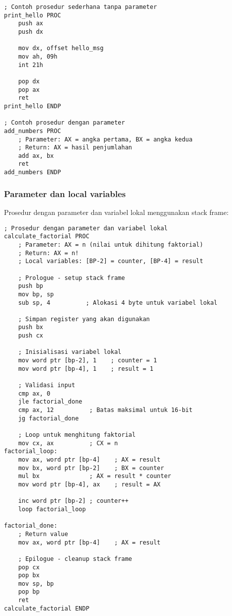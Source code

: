 \documentclass[../main.tex]{subfiles}
\begin{document}
                \begin{lstlisting}[language={[x86masm]Assembler}, caption=Contoh Prosedur Sederhana, label={lst:simple-procedure}]
; Contoh prosedur sederhana tanpa parameter
print_hello PROC
    push ax
    push dx
    
    mov dx, offset hello_msg
    mov ah, 09h
    int 21h
    
    pop dx
    pop ax
    ret
print_hello ENDP

; Contoh prosedur dengan parameter
add_numbers PROC
    ; Parameter: AX = angka pertama, BX = angka kedua
    ; Return: AX = hasil penjumlahan
    add ax, bx
    ret
add_numbers ENDP
                \end{lstlisting}

            \subsubsection{Parameter dan local variables}
                Prosedur dengan parameter dan variabel lokal menggunakan stack frame:

                \begin{lstlisting}[language={[x86masm]Assembler}, caption=Prosedur dengan Stack Frame, label={lst:stack-frame-procedure}]
; Prosedur dengan parameter dan variabel lokal
calculate_factorial PROC
    ; Parameter: AX = n (nilai untuk dihitung faktorial)
    ; Return: AX = n!
    ; Local variables: [BP-2] = counter, [BP-4] = result
    
    ; Prologue - setup stack frame
    push bp
    mov bp, sp
    sub sp, 4          ; Alokasi 4 byte untuk variabel lokal
    
    ; Simpan register yang akan digunakan
    push bx
    push cx
    
    ; Inisialisasi variabel lokal
    mov word ptr [bp-2], 1    ; counter = 1
    mov word ptr [bp-4], 1    ; result = 1
    
    ; Validasi input
    cmp ax, 0
    jle factorial_done
    cmp ax, 12          ; Batas maksimal untuk 16-bit
    jg factorial_done
    
    ; Loop untuk menghitung faktorial
    mov cx, ax          ; CX = n
factorial_loop:
    mov ax, word ptr [bp-4]    ; AX = result
    mov bx, word ptr [bp-2]    ; BX = counter
    mul bx              ; AX = result * counter
    mov word ptr [bp-4], ax    ; result = AX
    
    inc word ptr [bp-2] ; counter++
    loop factorial_loop
    
factorial_done:
    ; Return value
    mov ax, word ptr [bp-4]    ; AX = result
    
    ; Epilogue - cleanup stack frame
    pop cx
    pop bx
    mov sp, bp
    pop bp
    ret
calculate_factorial ENDP
                \end{lstlisting}
\end{document}
